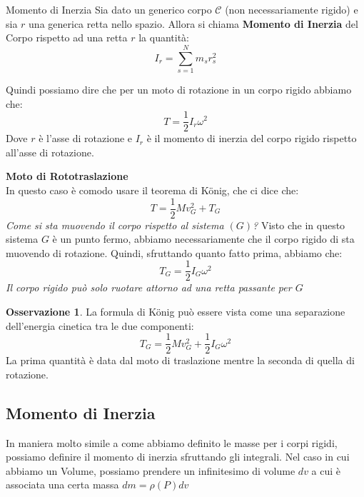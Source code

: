 \documentclass[11pt,a4paper,twoside]{article}
\theoremstyle{definition}
\newtheorem*{oss}{Osservazione}
\begin{document}
\begin{defn}{Momento di Inerzia}{}
	Sia dato un generico corpo $\mathscr C$ (non necessariamente rigido) e sia $r$ una generica retta nello spazio. Allora si chiama \textbf{Momento di Inerzia} del Corpo rispetto ad una retta $r$ la quantità:
\[ I_r = \sum_{s = 1}^N m_s r_s^2 \]
\end{defn}
\begin{center}
\end{center}
Quindi possiamo dire che per un moto di rotazione in un corpo rigido abbiamo che:
\[ T = \frac 12 I_r \omega^2 \]
Dove $r$ è l'asse di rotazione e $I_r$ è il momento di inerzia del corpo rigido rispetto all'asse di rotazione.

\textbf{Moto di Rototraslazione}\\
In questo caso è comodo usare il teorema di König, che ci dice che:
\[ T = \frac 12 Mv_G^2 + T_G \]
\textit{Come si sta muovendo il corpo rispetto al sistema $(G)$?} Visto che in questo sistema $G$ è un punto fermo, abbiamo necessariamente che il corpo rigido di sta muovendo di rotazione. Quindi, sfruttando quanto fatto prima, abbiamo che:
\[ T_G = \frac 12 I_G \omega^2 \]
\textit{Il corpo rigido può solo ruotare attorno ad una retta passante per $G$}

\begin{oss}
	La formula di König può essere vista come una separazione dell'energia cinetica tra le due componenti:
	\[ T_G = \frac 12 M v_G^2 + \frac 12 I_G \omega^2 \]
	La prima quantità è data dal moto di traslazione mentre la seconda di quella di rotazione.
\end{oss}

\subsection{Momento di Inerzia}

In maniera molto simile a come abbiamo definito le masse per i corpi rigidi, possiamo definire il momento di inerzia sfruttando gli integrali. Nel caso in cui abbiamo un Volume, possiamo prendere un infinitesimo di volume $dv$ a cui è associata una certa massa $dm = \rho(P)dv$
\end{document}
